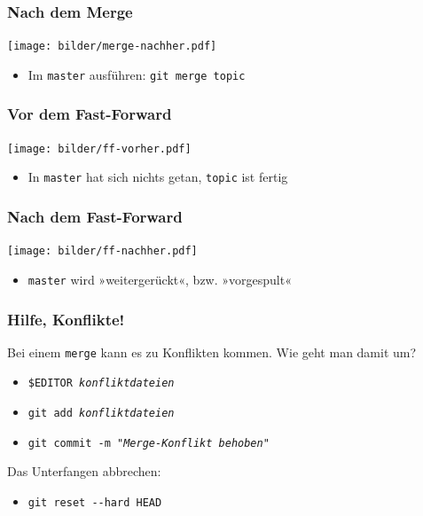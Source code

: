 \documentclass{beamer}
\begin{document}
\begin{frame}
 \frametitle{Nach dem Merge}
  


\begin{center}
\texttt{[image: bilder/merge-nachher.pdf]}
\end{center}

\begin{itemize}
  \item Im \texttt{master} ausführen: \texttt{git merge topic}
\end{itemize}

  
 \end{frame}
\begin{frame}
 \frametitle{Vor dem Fast-Forward}
  


\begin{center}
\texttt{[image: bilder/ff-vorher.pdf]}
\end{center}

\begin{itemize}
  \item In \texttt{master} hat sich nichts getan, \texttt{topic} ist fertig
\end{itemize}

  
 \end{frame}
\begin{frame}
 \frametitle{Nach dem Fast-Forward}
  


\begin{center}
\texttt{[image: bilder/ff-nachher.pdf]}
\end{center}

\begin{itemize}
  \item \texttt{master} wird »weitergerückt«, bzw. »vorgespult«
\end{itemize}

  
 \end{frame}
\begin{frame}
 \frametitle{Hilfe, Konflikte!}
  


Bei einem \texttt{merge} kann es zu Konflikten kommen. Wie geht man damit um?
\begin{itemize}
  \item \texttt{\$EDITOR \emph{konfliktdateien}}
  \item \texttt{git add \emph{konfliktdateien}}
  \item \texttt{git commit -m "\emph{Merge-Konflikt behoben}"}
\end{itemize}


\vspace{.5em}

Das Unterfangen abbrechen:
\begin{itemize}
  \item \texttt{git reset -{}-hard HEAD}
\end{itemize}

  
 \end{frame}
\end{document}

